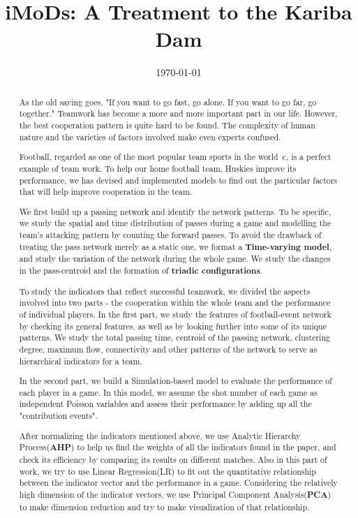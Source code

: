 \documentclass[12pt]{mcmthesis}
\begin{document}
	\linespread{0.6} %
	\setlength{\parskip}{0.5\baselineskip} %
	\title{iMoDs: A Treatment to the Kariba Dam}
	
	\date{\today}
	\begin{abstract}
		
		As the old saying goes, "If you want to go fast, go alone. If you want to go far, go together." Teamwork has become a more and more important part in our life. However, the best cooperation pattern is quite hard to be found. The complexity of human nature and the varieties of factors involved make even experts confused.
		
		Football, regarded as one of the most popular team sports in the world~c\cite{football}, is a perfect example of team work. To help our home football team, Huskies improve its performance, we has devised and implemented models to find out the particular factors that will help improve cooperation in the team. 
		
		We first build up a passing network and identify the network patterns. To be specific, we study the spatial and time distribution of passes during a game and modelling the team's attacking pattern by counting the forward passes. To avoid the drawback of treating the pass network merely as a static one, we format a \textbf{Time-varying model}, and study the variation of the network during the whole game. We study the changes in the pass-centroid and the formation of \textbf{triadic configurations}. 
		
		To study the indicators that reflect successful teamwork, we divided the aspects involved into two parts - the cooperation within the whole team and the performance of individual players. In the first part, we study the features of football-event network by checking its general features, as well as by looking further into some of its unique patterns. We study the total passing time, centroid of the passing network, clustering degree, maximum flow, connectivity and other patterns of the network to serve as hierarchical indicators for a team.
		
		In the second part, we build a Simulation-based model to evaluate the performance of each player in a game. In this model, we assume the shot number of each game as independent Poisson variables and assess their performance by adding up all the "contribution events".
		
		After normalizing the indicators mentioned above, we use Analytic Hierarchy Process(\textbf{AHP}) to help us find the weights of all the indicators found in the paper, and check its efficiency by comparing its results on different matches. Also in this part of work, we try to use Linear Regression(LR) to fit out the quantitative relationship between the indicator vector and the performance in a game. Considering the relatively high dimension of the indicator vectors, we use Principal Component Analysis(\textbf{PCA}) to make dimension reduction and try to make visualization of that relationship.
		

\end{abstract}
\end{document}
